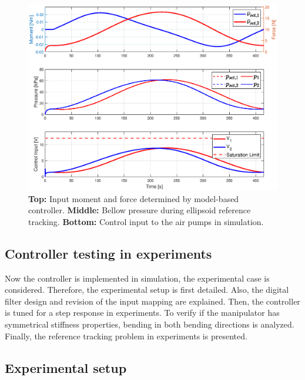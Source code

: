 \begin{figure}[H]
    \centering
    \includegraphics[width = \textwidth]{Figures/Chapter5/controlinputsimell.eps}
    \caption{\textbf{Top:} Input moment and force determined by model-based controller. \textbf{Middle:} Bellow pressure during ellipsoid reference tracking. \textbf{Bottom:} Control input to the air pumps in simulation.}
    \label{fig5:controlinputellipssim}
\end{figure}



\subsection{Controller testing in experiments}

Now the controller is implemented in simulation, the experimental case is considered. Therefore, the experimental setup is first detailed. Also, the digital filter design and revision of the input mapping are explained. Then, the controller is tuned for a step response in experiments. To verify if the manipulator has symmetrical stiffness properties, bending in both bending directions is analyzed. Finally, the reference tracking problem in experiments is presented. 


\subsection*{Experimental setup}

